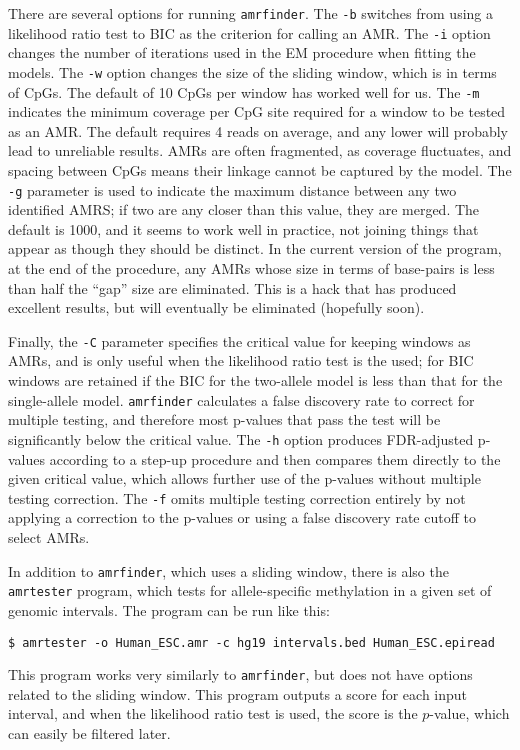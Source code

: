 \documentclass[10pt]{article}
\newcommand{\prog}[1]{\texttt{#1}}
\newcommand{\op}[1]{\texttt{#1}}
\begin{document}
There are several options for running \prog{amrfinder}. The \op{-b}
switches from using a likelihood ratio test to BIC as the criterion
for calling an AMR. The \op{-i} option changes the number of
iterations used in the EM procedure when fitting the models.
The \op{-w} option changes the size of the sliding
window, which is in terms of CpGs. The default of 10 CpGs per window
has worked well for us. The \op{-m} indicates the minimum coverage per
CpG site required for a window to be tested as an AMR. The default
requires 4 reads on average, and any lower will probably lead to
unreliable results. AMRs are often fragmented, as coverage fluctuates,
and spacing between CpGs means their linkage cannot be captured by the
model. The \op{-g} parameter is used to indicate the maximum distance
between any two identified AMRS; if two are any closer than this
value, they are merged. The default is 1000, and it seems to work well
in practice, not joining things that appear as though they should be
distinct. In the current version of the program, at the end of the
procedure, any AMRs whose size in terms of base-pairs is less than
half the ``gap'' size are eliminated. This is a hack that has produced
excellent results, but will eventually be eliminated (hopefully
soon).

Finally, the \op{-C} parameter specifies the critical value for
keeping windows as AMRs, and is only useful when the likelihood ratio
test is the used; for BIC windows are retained if the BIC for the
two-allele model is less than that for the single-allele model.
\prog{amrfinder} calculates a false discovery rate to correct for
multiple testing, and therefore most p-values that pass the test
will be significantly below the critical value. The \op{-h} option
produces FDR-adjusted p-values according to a step-up procedure
and then compares them directly to the given critical value, which 
allows further use of the p-values without multiple testing correction.
The \op{-f} omits multiple testing correction entirely by not applying
a correction to the p-values or using a false discovery rate cutoff
to select AMRs.

In addition to \prog{amrfinder}, which uses a sliding window, there is
also the \prog{amrtester} program, which tests for allele-specific
methylation in a given set of genomic intervals. The program can be
run like this:
\begin{verbatim}
$ amrtester -o Human_ESC.amr -c hg19 intervals.bed Human_ESC.epiread
\end{verbatim}
This program works very similarly to \prog{amrfinder}, but does not
have options related to the sliding window. This program outputs a
score for each input interval, and when the likelihood ratio test is
used, the score is the $p$-value, which can easily be filtered later.
\end{document}
